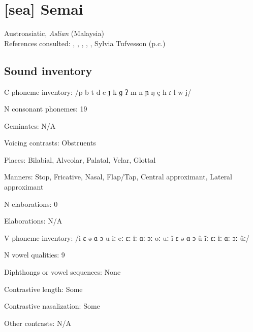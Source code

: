 {\section*{[sea] Semai}   %
Austroasiatic, \textit{Aslian} (Malaysia)\medskip\\
References consulted: \citet{Dentan2003}, \citet{Diffloth1976a}, \citet{Diffloth1976b}, \citet{Philips2007}, \citet{Sloan1988}, Sylvia Tufvesson (p.c.)

\subsection*{Sound inventory}
\begin{appendixdesc}

\item[C phoneme inventory:] /p b t d c ɟ k ɡ ʔ m n ɲ ŋ ç h ɾ l w j/

\item[N consonant phonemes:] 19

\item[Geminates:] N/A

\item[Voicing contrasts:] Obstruents

\item[Places:] Bilabial, Alveolar, Palatal, Velar, Glottal

\item[Manners:] Stop, Fricative, Nasal, Flap/Tap, Central approximant, Lateral approximant

\item[N elaborations:] 0

\item[Elaborations:] N/A

\item[V phoneme inventory:] /i ɛ ə ɑ ɔ u iː eː ɛː ɨː ɑː ɔː oː uː ĩ ɛ ə ɑ ɔ ũ ĩː ɛː ɨː ɑː ɔː ũː/

\item[N vowel qualities:] 9

\item[Diphthongs or vowel sequences:] None

\item[Contrastive length:] Some

\item[Contrastive nasalization:] Some

\item[Other contrasts:] N/A


\end{appendixdesc}}
